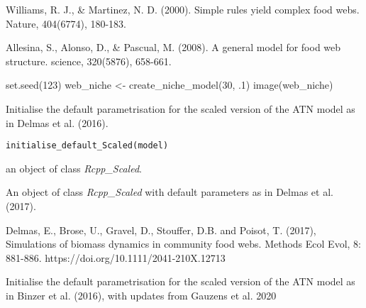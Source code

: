 \documentclass[letterpaper]{book}
\begin{document}
%
\begin{References}\relax
Williams, R. J., \& Martinez, N. D. (2000). Simple rules yield
complex food webs. Nature, 404(6774), 180-183.

Allesina, S., Alonso, D., \& Pascual, M. (2008). A general model for food
web structure. science, 320(5876), 658-661.
\end{References}
%
\begin{Examples}
\begin{ExampleCode}
set.seed(123)
web_niche <- create_niche_model(30, .1)
image(web_niche)
\end{ExampleCode}
\end{Examples}
%
\begin{Description}\relax
Initialise the default parametrisation for the scaled version of
the ATN model as in Delmas et al. (2016).
\end{Description}
%
\begin{Usage}
\begin{verbatim}
initialise_default_Scaled(model)
\end{verbatim}
\end{Usage}
%
\begin{Arguments}
\begin{ldescription}
\item[\code{model}] an object of class \emph{Rcpp\_Scaled}.
\end{ldescription}
\end{Arguments}
%
\begin{Value}
An object of class \emph{Rcpp\_Scaled} with default
parameters as in Delmas et al. (2017).
\end{Value}
%
\begin{References}\relax
Delmas, E., Brose, U., Gravel, D., Stouffer, D.B. and Poisot, T.
(2017), Simulations of biomass dynamics in community food webs. Methods
Ecol Evol, 8: 881-886. https://doi.org/10.1111/2041-210X.12713
\end{References}
%
\begin{Description}\relax
Initialise the default parametrisation for the scaled version of
the ATN model as in Binzer et al. (2016), with updates from Gauzens et al. 2020
\end{Description}
\end{document}
